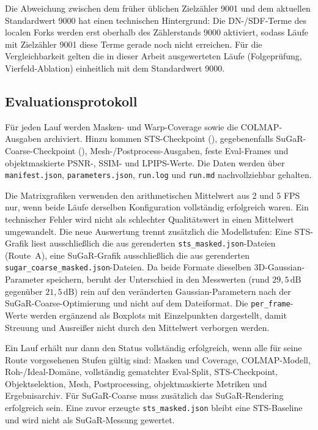 Die Abweichung zwischen dem früher üblichen Zielzähler 9001 und dem aktuellen
Standardwert 9000 hat einen technischen Hintergrund: Die DN-/SDF-Terme des
localen Forks werden erst oberhalb des Zählerstands 9000 aktiviert, sodass
Läufe mit Zielzähler 9001 diese Terme gerade noch nicht erreichen. Für die
Vergleichbarkeit gelten die in dieser Arbeit ausgewerteten Läufe
(Folgeprüfung, Vierfeld-Ablation) einheitlich mit dem Standardwert 9000.

\subsection{Evaluationsprotokoll}

Für jeden Lauf werden Masken- und Warp-Coverage sowie die COLMAP-Ausgaben
archiviert. Hinzu kommen STS-Checkpoint (), gegebenenfalls
SuGaR-Coarse-Checkpoint (), Mesh-/Postprocess-Ausgaben, feste
Eval-Frames und objektmaskierte PSNR-, SSIM- und LPIPS-Werte. Die Daten werden über
\texttt{manifest.json}, \texttt{parameters.json}, \texttt{run.log} und
\texttt{run.md} nachvollziehbar gehalten.

Die Matrixgrafiken verwenden den arithmetischen Mittelwert aus 2 und 5 FPS nur,
wenn beide Läufe derselben Konfiguration vollständig erfolgreich waren. Ein
technischer Fehler wird nicht als schlechter Qualitätswert in einen Mittelwert
umgewandelt. Die neue Auswertung trennt zusätzlich die Modellstufen: Eine
STS-Grafik liest ausschließlich die aus  gerenderten
\texttt{sts\_masked.json}-Dateien (Route~A), eine SuGaR-Grafik ausschließlich die
aus  gerenderten \texttt{sugar\_coarse\_masked.json}-Dateien. Da
beide Formate dieselben 3D-Gaussian-Parameter speichern, beruht der Unterschied
in den Messwerten (rund $29{,}5\,\mathrm{dB}$ gegenüber $21{,}5\,\mathrm{dB}$)
rein auf den veränderten Gaussian-Parametern nach der SuGaR-Coarse-Optimierung und
nicht auf dem Dateiformat. Die \texttt{per\_frame}-Werte werden ergänzend als
Boxplots mit Einzelpunkten dargestellt, damit Streuung und Ausreißer nicht durch
den Mittelwert verborgen werden.

Ein Lauf erhält nur dann den Status vollständig erfolgreich, wenn alle für
seine Route vorgesehenen Stufen gültig sind: Masken und Coverage,
COLMAP-Modell, Roh-/Ideal-Domäne, vollständig gematchter Eval-Split,
STS-Checkpoint, Objektselektion, Mesh, Postprocessing, objektmaskierte Metriken
und Ergebnisarchiv. Für SuGaR-Coarse muss zusätzlich das SuGaR-Rendering
erfolgreich sein. Eine zuvor erzeugte \texttt{sts\_masked.json} bleibt eine
STS-Baseline und wird nicht als SuGaR-Messung gewertet.

